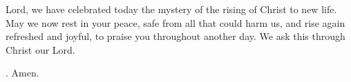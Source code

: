 \lettrine[loversize=0.15,lines=2]{L}{}ord,
we have celebrated today
the mystery of the rising of Christ to new life.
May we now rest in your peace,
safe from all that could harm us,
and rise again refreshed and joyful,
to praise you throughout another day.
We ask this through Christ our Lord.
\par \Rbar. Amen.
